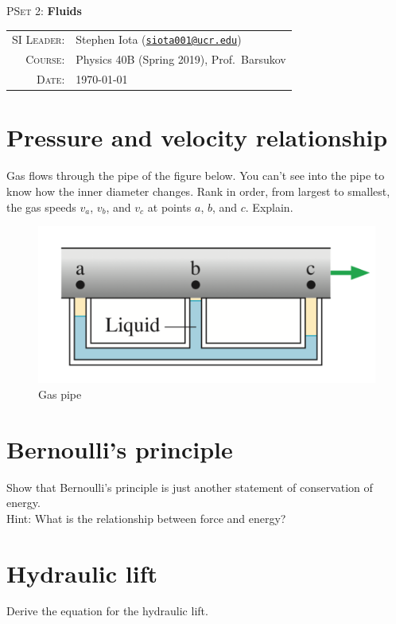 \documentclass[11pt]{article}
\newcommand{\email}[1]{\texttt{\href{mailto:#1}{#1}}}
\begin{document}
\begin{center}

\Large{\textsc{PSet 2}: \textbf{Fluids}}
\end{center}
\vspace{.5mm}



\begin{tabular}{rl}
\textsc{SI Leader}:
&
Stephen Iota (\email{siota001@ucr.edu})
\\
\textsc{Course}:
&
Physics 40B (Spring 2019), Prof.~Barsukov
\\
\textsc{Date}:
&
\today
\end{tabular}



\section{Pressure and velocity relationship}


Gas flows through the pipe of the figure below. You can't see into the pipe to know how the inner diameter changes. Rank in order, from largest to smallest, the gas speeds $v_a$, $v_b$, and $v_c$ at points $a$, $b$, and $c$. Explain.

\begin{figure}[h!]
	\centering
	\includegraphics[width=0.5\linewidth]{pset2_fig2}
	\caption{Gas pipe \label{gas}}
	\end{figure}




\section{Bernoulli's principle}
Show that Bernoulli's principle is just another statement of conservation of energy. \\
Hint: What is the relationship between force and energy?


\section{Hydraulic lift}
Derive the equation for the hydraulic lift.
\end{document}
